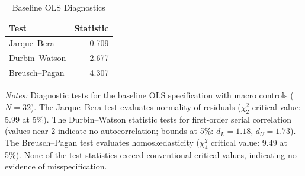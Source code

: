 \begin{table}[!htbp]
\centering
\small
\caption{Baseline OLS Diagnostics}
\label{tab:ols_diagnostics}
\begin{threeparttable}

\begin{tabular}{lr}
\toprule
Test & Statistic \\
\midrule
Jarque--Bera & 0.709 \\
Durbin--Watson & 2.677 \\
Breusch--Pagan & 4.307 \\
\bottomrule
\end{tabular}
\begin{tablenotes}[flushleft]
\footnotesize
\item \textit{Notes:} Diagnostic tests for the baseline OLS specification with macro controls ($N = 32$).
The Jarque--Bera test evaluates normality of residuals ($\chi^2_{2}$ critical value: 5.99 at 5\%).
The Durbin--Watson statistic tests for first-order serial correlation (values near 2 indicate no autocorrelation; bounds at 5\%: $d_L = 1.18$, $d_U = 1.73$).
The Breusch--Pagan test evaluates homoskedasticity ($\chi^2_{4}$ critical value: 9.49 at 5\%).
None of the test statistics exceed conventional critical values, indicating no evidence of misspecification.
\end{tablenotes}
\end{threeparttable}
\end{table}
